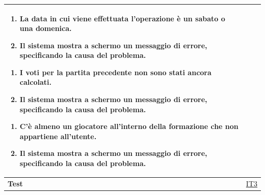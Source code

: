 \begin{table}[H]
\begin{tabularx}{\textwidth}{|l|X|}
\begin{enumerate}[leftmargin=*,label=3.\arabic*]
    \item La data in cui viene effettuata l'operazione è un sabato o una domenica.
    \item Il sistema mostra a schermo un messaggio di errore, specificando la causa del problema.
\end{enumerate} 
\begin{enumerate}[leftmargin=*,label=4.\arabic*]
    \item I voti per la partita precedente non sono stati ancora calcolati.
    \item Il sistema mostra a schermo un messaggio di errore, specificando la causa del problema.
\end{enumerate}
\begin{enumerate}[leftmargin=*,label=5.\arabic*]
    \item C'è almeno un giocatore all'interno della formazione che non appartiene all'utente.
    \item Il sistema mostra a schermo un messaggio di errore, specificando la causa del problema.
\end{enumerate} \\
\hline
\textbf{Test} & \hyperref[IT3]{IT3} \\
\hline
\end{tabularx}

\end{table}


